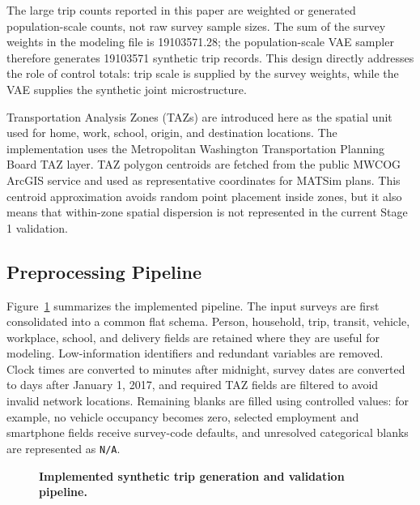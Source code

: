 \documentclass[3p,times,procedia]{elsarticle}
\begin{document}
The large trip counts reported in this paper are weighted or generated population-scale counts, not raw survey sample sizes. The sum of the survey weights in the modeling file is \num{19103571.28}; the population-scale VAE sampler therefore generates \num{19103571} synthetic trip records. This design directly addresses the role of control totals: trip scale is supplied by the survey weights, while the VAE supplies the synthetic joint microstructure.

Transportation Analysis Zones (TAZs) are introduced here as the spatial unit used for home, work, school, origin, and destination locations. The implementation uses the Metropolitan Washington Transportation Planning Board TAZ layer. TAZ polygon centroids are fetched from the public MWCOG ArcGIS service and used as representative coordinates for MATSim plans. This centroid approximation avoids random point placement inside zones, but it also means that within-zone spatial dispersion is not represented in the current Stage 1 validation.

\subsection{Preprocessing Pipeline}
Figure~\ref{fig:pipeline} summarizes the implemented pipeline. The input surveys are first consolidated into a common flat schema. Person, household, trip, transit, vehicle, workplace, school, and delivery fields are retained where they are useful for modeling. Low-information identifiers and redundant variables are removed. Clock times are converted to minutes after midnight, survey dates are converted to days after January 1, 2017, and required TAZ fields are filtered to avoid invalid network locations. Remaining blanks are filled using controlled values: for example, no vehicle occupancy becomes zero, selected employment and smartphone fields receive survey-code defaults, and unresolved categorical blanks are represented as \texttt{N/A}.

\begin{figure}[H]
\centering
{}
\caption{\textbf{Implemented synthetic trip generation and validation pipeline.}}
\label{fig:pipeline}
\end{figure}
\end{document}
